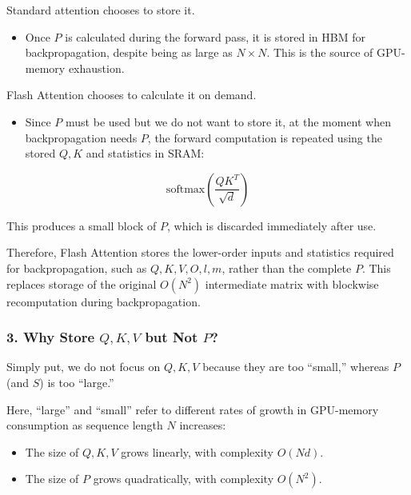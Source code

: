 Standard attention chooses to store it.

\begin{itemize}
\tightlist
\item
  Once \(P\) is calculated during the forward pass, it is stored in HBM for backpropagation, despite being as large as \(N \times N\). This is the source of GPU-memory exhaustion.
\end{itemize}

Flash Attention chooses to calculate it on demand.

\begin{itemize}
\tightlist
\item
{}
  Since \(P\) must be used but we do not want to store it, at the moment when backpropagation needs \(P\), the forward computation is repeated using the stored \(Q,K\) and statistics in SRAM:
\end{itemize}

\[
\mathrm{softmax}\left(\frac{QK^T}{\sqrt{d}}\right)
\]

This produces a small block of \(P\), which is discarded immediately after use.

Therefore, Flash Attention stores the lower-order inputs and statistics required for backpropagation, such as \(Q,K,V,O,l,m\), rather than the complete \(P\). This replaces storage of the original \(O(N^2)\) intermediate matrix with blockwise recomputation during backpropagation.

\hypertarget{why-store-qkv-but-not-p}{%
\subsubsection{\texorpdfstring{3. Why Store \(Q,K,V\) but Not \(P\)?}{3. Why Store Q,K,V but Not P?}}\label{why-store-qkv-but-not-p}}

Simply put, we do not focus on \(Q,K,V\) because they are too ``small,'' whereas \(P\) (and \(S\)) is too ``large.''

Here, ``large'' and ``small'' refer to different rates of growth in GPU-memory consumption as sequence length \(N\) increases:

\begin{itemize}
\tightlist
\item
  The size of \(Q,K,V\) grows linearly, with complexity \(O(Nd)\).
\item
  The size of \(P\) grows quadratically, with complexity \(O(N^2)\).
\end{itemize}

